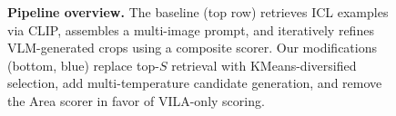 \begin{figure}[t]
{\begin{tikzpicture}
\end{tikzpicture}%
}
\caption{\textbf{Pipeline overview.}  The \baseline baseline (top row)
retrieves ICL examples via CLIP, assembles a multi-image prompt, and
iteratively refines VLM-generated crops using a composite scorer.  Our
modifications (bottom, blue) replace top-$S$ retrieval with
KMeans-diversified selection, add multi-temperature candidate generation,
and remove the Area scorer in favor of VILA-only scoring.}
\label{fig:pipeline}
\end{figure}
